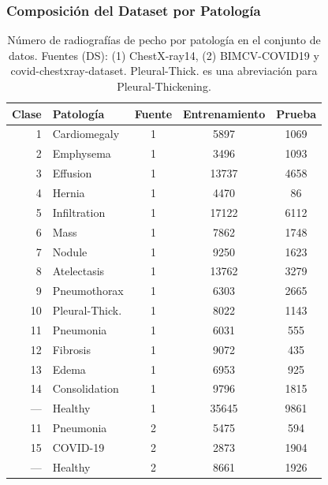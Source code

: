 \begin{frame}
    \frametitle{Composición del Dataset por Patología}
    \begin{table}[!ht]
        \centering
        \fontsize{7}{8}\selectfont
        \begin{tabular}{| r |l | c | c | c |}
         \hline
         Clase & Patología & Fuente & Entrenamiento & Prueba  \\
         \hline\hline
         1  & Cardiomegaly       & 1 & 5897  & 1069 \\
         2  & Emphysema          & 1 & 3496  & 1093 \\
         3  & Effusion           & 1 & 13737 & 4658 \\
         4  & Hernia             & 1 & 4470  & 86   \\
         5  & Infiltration       & 1 & 17122 & 6112 \\
         6  & Mass               & 1 & 7862  & 1748 \\
         7  & Nodule             & 1 & 9250  & 1623 \\
         8  & Atelectasis        & 1 & 13762 & 3279 \\
         9  & Pneumothorax       & 1 & 6303  & 2665 \\
         10 & Pleural-Thick.     & 1 & 8022  & 1143 \\
         11 & Pneumonia          & 1 & 6031  & 555  \\
         12 & Fibrosis           & 1 & 9072  & 435  \\
         13 & Edema              & 1 & 6953  & 925  \\
         14 & Consolidation      & 1 & 9796  & 1815 \\
         ---&  Healthy           & 1 & 35645 & 9861 \\
         \hline
         11 & Pneumonia          & 2 & 5475  & 594  \\
         15 & COVID-19           & 2 & 2873  & 1904 \\
         ---&  Healthy           & 2 & 8661  & 1926 \\
         \hline
        \end{tabular}
        \caption{Número de radiografías de pecho por patología en el conjunto de datos. Fuentes (DS): (1) ChestX-ray14,
                 (2) BIMCV-COVID19 y covid-chestxray-dataset. Pleural-Thick. es una abreviación para Pleural-Thickening.}
        \label{table_dataset}
    \end{table}
\end{frame}

